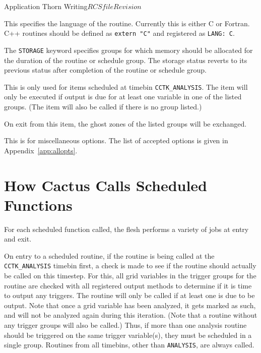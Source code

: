 \begin{cactuspart}{Application Thorn Writing}{$RCSfile$}{$Revision$}
\begin{Lentry}
\item[\texttt{LANG}]
This specifies the language of the routine.  Currently this is either
C or Fortran. C++ routines should be defined as \texttt{extern "C"}
and registered as \texttt{LANG: C}.
\item[\texttt{STORAGE}] The \texttt{STORAGE} keyword specifies groups for
which memory should be allocated for the duration of the routine or
schedule group.  The storage status reverts to its previous status
after completion of the routine or schedule group.
\item[\texttt{TRIGGER}]
This is only used for items scheduled at timebin \texttt{CCTK\_ANALYSIS}.
The item will only be executed if output is due for at least one
variable in one of the listed groups.  (The item will also be called
if there is no group listed.)
\item[\texttt{SYNC}]
On exit from this item, the ghost zones of the listed groups will be
exchanged.
\item[\texttt{OPTIONS}]
This is for miscellaneous options.  The list of accepted options is
given in Appendix~\ref{app:allopts}.
\end{Lentry}


\section{How Cactus Calls Scheduled Functions}
\label{scheduling:calling_scheduled_functions}

For each scheduled function called, the flesh performs a variety of jobs
at entry and exit.

On entry to a scheduled routine, if the routine is being called at the
\texttt{CCTK\_ANALYSIS} timebin first, a check is made to see if the routine should
actually be called on this timestep. For this, all grid variables in the
trigger groups for the routine are checked with all registered output
methods to determine if it is time to output any triggers. The routine
will only be called if at least one is due to be output. Note that once
a grid variable has been analyzed, it gets marked as such, and will not
be analyzed again during this iteration.
(Note that a routine without any trigger groups will also be called.)
Thus, if more than one analysis
routine should be triggered on the same trigger variable(s), they must
be scheduled in a single group. Routines from all timebins, other than \texttt{ANALYSIS}, are always called.


\end{cactuspart}
